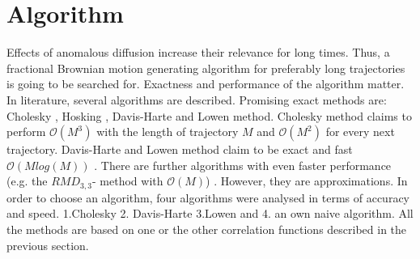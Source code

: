 \documentclass[
  a4paper,BCOR10mm,oneside,
  headsepline,footsepline,%
  fleqn,openbib
]{scrbook}
\begin{document}

\section{Algorithm}
Effects of anomalous diffusion increase their relevance for long times. Thus, a fractional Brownian motion generating algorithm for preferably long trajectories is going to be searched for. Exactness and performance of the algorithm matter. In literature, several algorithms are described. Promising exact methods are: Cholesky \cite{Dieker2004}, Hosking \cite{WRCR:WRCR3676}, Davis-Harte \cite{Dieker2004} and  Lowen \cite{Lowen1999} method. Cholesky  method claims to perform $\mathcal{O}(M^3)$ with the length of trajectory $M$ and $\mathcal{O}(M^2)$ for every next trajectory. Davis-Harte and Lowen method claim to be exact and fast $\mathcal{O}(M log(M))$ \cite{DAVIES1987}\cite{Lowen1999}. There are further algorithms with even faster performance (e.g. the $RMD_{3,3}$- method \cite{Dieker2004} with $\mathcal{O}(M)$) . However, they are approximations. In order to choose an algorithm, four algorithms were analysed in terms of accuracy and speed. 1.Cholesky  2. Davis-Harte 3.Lowen and 4. an own naive algorithm. All the methods are based on one or the other correlation functions described in the previous section.  
\end{document}
